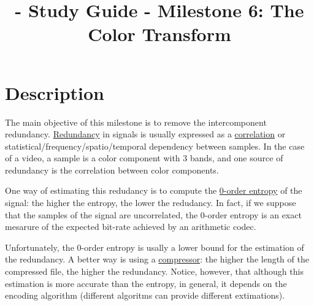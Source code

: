 
\title{\SM{} - Study Guide - Milestone 6: The Color Transform}

\maketitle

\section{Description}

The main objective of this milestone is to remove the intercomponent
redundancy.
\href{https://en.wikipedia.org/wiki/Data_redundancy}{Redundancy} in
signals is usually expressed as a
\href{https://en.wikipedia.org/wiki/Correlation_and_dependence}{correlation}
or statistical/frequency/spatio/temporal dependency between
samples. In the case of a video, a sample is a color component with 3
bands, and one source of redundancy is the correlation between color
components.

One way of estimating this redudancy is to compute the
\href{https://en.wikipedia.org/wiki/Entropy_(information_theory)}{0-order
  entropy} of the signal: the higher the entropy, the lower the
redudancy. In fact, if we suppose that the samples of the signal are
uncorrelated, the 0-order entropy is an exact mesarure of the expected
bit-rate achieved by an arithmetic codec.

Unfortunately, the 0-order entropy is usally a lower bound for the
estimation of the redundancy. A better way is using a
\href{https://en.wikipedia.org/wiki/Data_compression}{compressor}: the
higher the length of the compressed file, the higher the
redundancy. Notice, however, that although this estimation is more
accurate than the entropy, in general, it depends on the encoding
algorithm (different algoritms can provide different extimations).


